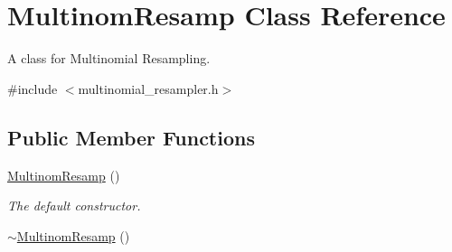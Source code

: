 \hypertarget{classMultinomResamp}{}\section{Multinom\+Resamp Class Reference}
\label{classMultinomResamp}


A class for Multinomial Resampling.  




{\ttfamily \#include $<$multinomial\+\_\+resampler.\+h$>$}

\subsection*{Public Member Functions}
\begin{DoxyCompactItemize}
\item 
\hyperlink{classMultinomResamp_a3134e22c0b7e0215045eb783bdc44669}{Multinom\+Resamp} ()\hypertarget{classMultinomResamp_a3134e22c0b7e0215045eb783bdc44669}{}\label{classMultinomResamp_a3134e22c0b7e0215045eb783bdc44669}

\begin{DoxyCompactList}\small\item\em The default constructor. \end{DoxyCompactList}\item 
\hyperlink{classMultinomResamp_a590495e677a522fa7863e3885631f777}{$\sim$\+Multinom\+Resamp} ()\hypertarget{classMultinomResamp_a590495e677a522fa7863e3885631f777}{}\label{classMultinomResamp_a590495e677a522fa7863e3885631f777}


\end{DoxyCompactItemize}
